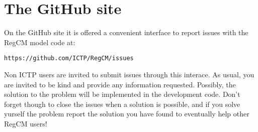 %
%

\section{The GitHub site}

On the GitHub site it is offered a convenient interface to report issues with
the RegCM model code at:

\begin{Verbatim}
https://github.com/ICTP/RegCM/issues
\end{Verbatim}

Non ICTP users are invited to submit issues through this interace. As usual,
you are invited to be kind and provide any information requested. Possibly,
the solution to the problem will be implemented in the development code.
Don't forget though to close the issues when a solution is possible, and if
you solve yurself the problem report the solution you have found to eventually
help other RegCM users!
